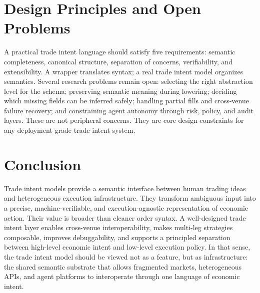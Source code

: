 \documentclass{article}
\begin{document}
\section{Design Principles and Open Problems}

A practical trade intent language should satisfy five requirements: semantic completeness, canonical structure, separation of concerns, verifiability, and extensibility. A wrapper translates syntax; a real trade intent model organizes semantics. Several research problems remain open: selecting the right abstraction level for the schema; preserving semantic meaning during lowering; deciding which missing fields can be inferred safely; handling partial fills and cross-venue failure recovery; and constraining agent autonomy through risk, policy, and audit layers. These are not peripheral concerns. They are core design constraints for any deployment-grade trade intent system.

\section{Conclusion}

Trade intent models provide a semantic interface between human trading ideas and heterogeneous execution infrastructure. They transform ambiguous input into a precise, machine-verifiable, and execution-agnostic representation of economic action. Their value is broader than cleaner order syntax. A well-designed trade intent layer enables cross-venue interoperability, makes multi-leg strategies composable, improves debuggability, and supports a principled separation between high-level economic intent and low-level execution policy. In that sense, the trade intent model should be viewed not as a feature, but as infrastructure: the shared semantic substrate that allows fragmented markets, heterogeneous APIs, and agent platforms to interoperate through one language of economic intent.



\end{document}

